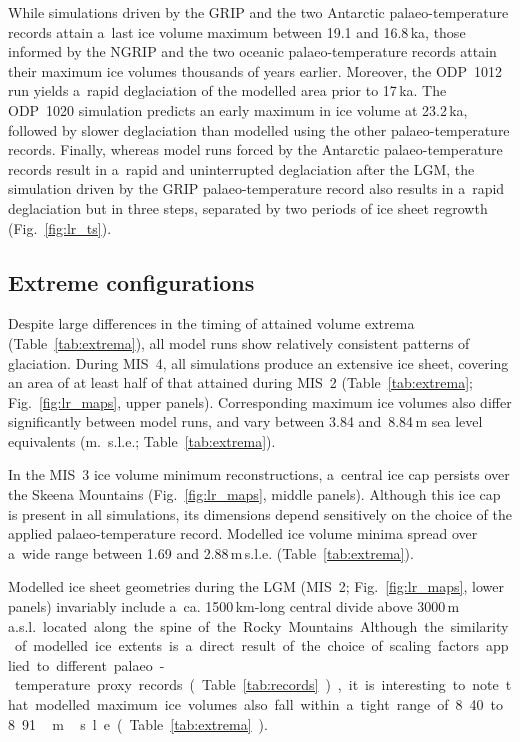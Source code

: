 \documentclass[tc, manuscript]{copernicus}
\begin{document}
      While simulations driven by the GRIP and the two Antarctic
      palaeo-temperature records attain a~last ice volume maximum between
      19.1 and 16.8\,\unit{ka}, those informed by the NGRIP and the two
      oceanic palaeo-temperature records attain their maximum ice volumes
      thousands of years earlier. Moreover, the ODP~1012 run yields a~rapid
      deglaciation of the modelled area prior to 17\,\unit{ka}. The ODP~1020
      simulation predicts an early maximum in ice volume at 23.2\,\unit{ka},
      followed by slower deglaciation than modelled using the other
      palaeo-temperature records. Finally, whereas model runs forced by the
      Antarctic palaeo-temperature records result in a~rapid and
      uninterrupted deglaciation after the LGM, the simulation driven by the
      GRIP palaeo-temperature record also results in a~rapid deglaciation
      but in three steps, separated by two periods of ice sheet regrowth
      (Fig.~\ref{fig:lr_ts}).

\subsection{Extreme configurations}

      Despite large differences in the timing of attained volume extrema
      (Table~\ref{tab:extrema}), all model runs show relatively consistent
      patterns of glaciation. During MIS~4, all simulations produce an
      extensive ice sheet, covering an area of at least half of that
      attained during MIS~2 (Table~\ref{tab:extrema};
      Fig.~\ref{fig:lr_maps}, upper panels). Corresponding maximum ice
      volumes also differ significantly between model runs, and vary between
      3.84 and~8.84\,m sea level equivalents (m.~s.l.e.;
      Table~\ref{tab:extrema}).

      In the MIS~3 ice volume minimum reconstructions, a~central ice cap
      persists over the Skeena Mountains (Fig.~\ref{fig:lr_maps}, middle
      panels). Although this ice cap is present in all simulations, its
      dimensions depend sensitively on the choice of the applied
      palaeo-temperature record. Modelled ice volume minima spread over
      a~wide range between 1.69 and 2.88\,\unit{m}\,s.l.e.
      (Table~\ref{tab:extrema}).

      Modelled ice sheet geometries during the LGM (MIS~2;
      Fig.~\ref{fig:lr_maps}, lower panels) invariably include a~ca.
      1500\,\unit{km}-long central divide above 3000\,\unit{m\,a.s.l.}
      located along the spine of the Rocky Mountains. Although the
      similarity of modelled ice extents is a~direct result of the choice of
      scaling factors applied to different palaeo-temperature proxy records
      (Table~\ref{tab:records}), it is interesting to note that modelled
      maximum ice volumes also fall within a~tight range of 8.40 to
      8.91\,\unit{m}\,s.l.e. (Table~\ref{tab:extrema}).
\end{document}

